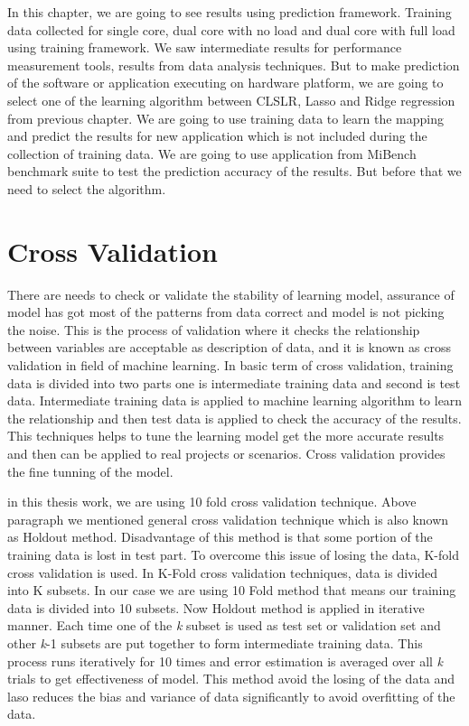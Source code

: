 \setlength{\parindent}{4em}
\setlength{\parskip}{1em}

In this chapter, we are going to see results using prediction framework. Training data collected for single core, dual core with no load and dual core with full load using training framework. We saw intermediate results for performance measurement tools, results from data analysis techniques. But to make prediction of the software or application executing on hardware platform, we are going to select one of the learning algorithm between CLSLR, Lasso and Ridge regression from previous chapter.  We are going to use training data to learn the mapping and predict the results for new application which is not included during the collection of training data. We are going to use application from MiBench benchmark suite to test the prediction accuracy of the results. But before that we need to select the algorithm. 

\section{Cross Validation}
There are needs to check or validate the stability of learning model, assurance of model has got most of the patterns from data correct and model is not picking the noise. This is the process of validation where it checks the relationship between variables are acceptable as description of data, and it is known as cross validation in field of machine learning. In basic term of cross validation, training data is divided into two parts one is intermediate training data and second is test data.  Intermediate training data is applied to machine learning algorithm to learn the relationship and then test data is applied to check the accuracy of the results. This techniques helps to tune the learning model get the more accurate results and then can be applied to real projects or scenarios. Cross validation provides the fine tunning of the model.

\par in this thesis work, we are using 10 fold cross validation technique. Above paragraph we mentioned general cross validation technique which is also known as Holdout method. Disadvantage of this method is that some portion of the training data is lost in test part. To overcome this issue of losing the data, K-fold cross validation is used. In K-Fold cross validation techniques, data is divided into K subsets. In our case we are using 10 Fold method that means our training data is divided into 10 subsets. Now Holdout method is applied in iterative manner. Each time one of the \textit{k} subset is used as test set or validation set and other \textit{k}-1 subsets are put together to form intermediate training data. This process runs iteratively for 10 times and error estimation is averaged over all \textit{k} trials to get effectiveness of model. This method avoid the losing of the data and laso reduces the bias and variance of data significantly to avoid overfitting of the data. 

